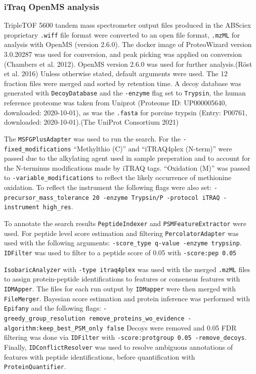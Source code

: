 \documentclass[9pt,lineno]{elife}
\begin{document}
\hypertarget{openms-chap3}{%
\subsubsection{iTraq OpenMS analysis}\label{openms-chap3}}

TripleTOF 5600 tandem mass spectrometer output files produced in the ABSciex proprietary \texttt{.wiff} file format were converted to an open file format, \texttt{.mzML} for analysis with OpenMS (version 2.6.0). The docker image of ProteoWizard version 3.0.20287 was used for conversion, and peak picking was applied on conversion (Chambers et al. 2012). OpenMS version 2.6.0 was used for further analysis.(Röst et al. 2016)
Unless otherwise stated, default arguments were used.
The 12 fraction files were merged and sorted by retention time.
A decoy database was generated with \texttt{DecoyDatabase} and the \texttt{-enzyme} flag set to \texttt{Trypsin}, the human reference proteome was taken from Uniprot (Proteome ID: UP000005640, downloaded: 2020-10-01), as was the \texttt{.fasta} for porcine trypsin (Entry: P00761, downloaded: 2020-10-01).(The UniProt Consortium 2021)

The \texttt{MSFGPlusAdapter} was used to run the search.
For the \texttt{-fixed\_modifications} ``Methylthio (C)'' and ``iTRAQ4plex (N-term)'' were passed due to the alkylating agent used in sample preperation and to account for the N-terminus modifications made by iTRAQ tags.
``Oxidation (M)'' was passed to \texttt{-variable\_modifications} to reflect the likely occurrence of methionine oxidation.
To reflect the instrument the following flags were also set: \texttt{-precursor\_mass\_tolerance\ 20\ -enzyme\ Trypsin/P\ -protocol\ iTRAQ\ -instrument\ high\_res}.

To annotate the search results \texttt{PeptideIndexer} and \texttt{PSMFeatureExtractor} were used.
For peptide level score estimation and filtering \texttt{PercolatorAdapter} was used with the following arguments: \texttt{-score\_type\ q-value\ -enzyme\ trypsinp}.
\texttt{IDFilter} was used to filter to a peptide score of 0.05 with \texttt{-score:pep\ 0.05}

\texttt{IsobaricAnalyzer} with \texttt{-type\ itraq4plex} was used with the merged \texttt{.mzML} files to assign protein-peptide identifications to features or consensus features with \texttt{IDMApper}.
The files for each run output by \texttt{IDMapper} were then merged with \texttt{FileMerger}.
Bayesian score estimation and protein inference was performed with \texttt{Epifany} and the following flags: \texttt{-greedy\_group\_resolution\ remove\_proteins\_wo\_evidence\ -algorithm:keep\_best\_PSM\_only\ false}
Decoys were removed and 0.05 FDR filtering was done via \texttt{IDFilter} with \texttt{-score:protgroup\ 0.05\ -remove\_decoys}.
Finally, \texttt{IDConflictResolver} was used to resolve ambiguous annotations of features with peptide identifications, before quantification with \texttt{ProteinQuantifier}.
\end{document}
